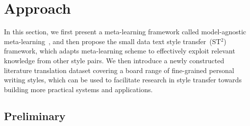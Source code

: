\section{Approach}
\label{sec:approach}
In this section, we first present a meta-learning framework called model-agnostic meta-learning~\citep{finn2017model}, and then propose the small data text style transfer~(ST$^2$) framework, which adapts meta-learning scheme to effectively exploit relevant knowledge from other style pairs. We then introduce a newly constructed literature translation dataset covering a board range of fine-grained personal writing styles, which can be used to facilitate research in style transfer towards building more practical systems and applications.
\subsection{Preliminary}
%
%
%
